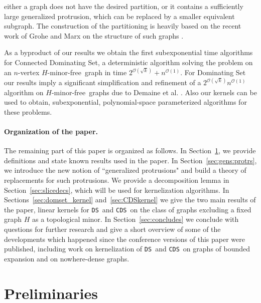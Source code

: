 \documentclass[11pt]{article}
\newcommand{\Hmf}{$H$-minor-free}
\newcommand{\tDS}{{\texttt{\sc DS}}}
\newcommand{\tCDS}{{\texttt{\sc CDS}}}
\newcommand{\cO}{\mathcal{O}}
\begin{document}
either   a graph does not have the desired partition, or  it   contains a  sufficiently large generalized protrusion, which can be replaced by a smaller equivalent subgraph.  
The construction of the partitioning  is heavily based on the recent work of Grohe and Marx on the structure of  such graphs  \cite{GroheM12}.


   As a byproduct of our results we  obtain the first subexponential time  algorithms for {\sc Connected Dominating Set}, a deterministic algorithm  solving the problem on an $n$-vertex \Hmf \, graph in  time $2^{\cO(\sqrt{k})}+ n^{\cO(1)}$.  For {\sc Dominating Set} our results imply a significant 
simplification and refinement  of  a $2^{\cO(\sqrt{k})}n^{\cO(1)}$ algorithm on \Hmf \, graphs due to Demaine et al. \cite{DemaineFHT05sub}. 
Also our kernels can be used to obtain, subexponential, polynomial-space parameterized algorithms for these problems.    

\paragraph{Organization of the paper.}
The remaining part of this paper is organized as follows.
In Section~\ref{sec:defs_and_nots}, we provide definitions and  state known results used in the paper. In Section~\ref{sec:gens:protrs}, we introduce the new notion of ``generalized protrusions" and build a theory of  replacements for such protrusions. 
We provide a decomposition lemma in Section~\ref{sec:slicedecs}, which will be used  for kernelization algorithms. In Sections~\ref{sec:domset_kernel} and~\ref{sec:CDSkernel} we give the two main results of the paper, linear kernels for \tDS\ and \tCDS\ on  the class of graphs excluding a fixed graph $H$ as a topological minor. In Section~\ref{sec:concludes}  we conclude with questions for further research and give a  short overview of some of the developments which happened since the conference versions of this paper were published, including work on  kernelization of \tDS\ and \tCDS\ on graphs of bounded expansion and on nowhere-dense graphs. 


\section{Preliminaries}
\label{sec:defs_and_nots}
\end{document}

